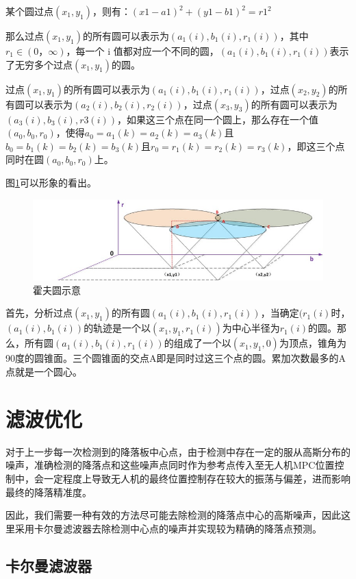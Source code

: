 某个圆过点$(x_{1}, y_{1})$，则有：$(x1-a1)^2 + (y1-b1)^2 = r1^2$

那么过点$(x_{1}, y_{1})$的所有圆可以表示为$(a_{1}(i), b_{1}(i), r_{1}(i))$，其中$r_{1} \in (0，\infty)$，每⼀个 i 值都对应⼀个不同的圆，$(a_{1}(i), b_{1}(i), r_{1}(i))$表示了无穷多个过点$(x_{1}, y_{1})$的圆。

过点$(x_{1}, y_{1})$的所有圆可以表示为$(a_{1}(i), b_{1}(i),r_{1}(i))$，过点$(x_{2}, y_{2})$的所有圆可以表示为$(a_{2}(i),b_{2}(i),r_{2}(i))$，过点$(x_{3}, y_{3})$的所有圆可以表示为$(a_{3}(i),b_{3}(i),r3(i))$，如果这三个点在同一个圆上，那么存在一个值$(a_{0},b_{0},r_{0})$，使得$a_{0} = a_{1}(k) = a_{2}(k) = a_{3}(k)$且$b_{0} = b_{1}(k) = b_{2}(k) = b_{3}(k)$且$r_{0} = r_{1}(k) = r_{2}(k) = r_{3}(k)$，即这三个点同时在圆$(a_{0}, b_{0}, r_{0})$上。

图\ref{Fig:img2}可以形象的看出。

\begin{figure}[ht]
  \centering
  \includegraphics[width=0.8\linewidth]{./Figure/Hough_Circle.png}
  \caption{霍夫圆示意}\label{Fig:img2}
\end{figure}

⾸先，分析过点$(x_{1}, y_{1})$的所有圆$(a_{1}(i), b_{1}(i),r_{1}(i))$，当确定$(r_{1}(i)$时，$(a_{1}(i), b_{1}(i))$的轨迹是⼀个以$(x_{1}, y_{1}, r_{1}(i))$为中心半径为$r_{1}(i)$的圆。那么，所有圆$(a_{1}(i), b_{1}(i),r_{1}(i))$的组成了一个以$(x_{1}, y_{1}, 0)$为顶点，锥角为90度的圆锥面。三个圆锥面的交点A即是同时过这三个点的圆。累加次数最多的A点就是一个圆⼼。

\section{滤波优化}

对于上一步每一次检测到的降落板中心点，由于检测中存在一定的服从高斯分布的噪声，准确检测的降落点和这些噪声点同时作为参考点传入至无人机MPC位置控制中，会一定程度上导致无人机的最终位置控制存在较大的振荡与偏差，进而影响最终的降落精准度。

因此，我们需要一种有效的方法尽可能去除检测的降落点中心的高斯噪声，因此这里采用卡尔曼滤波器去除检测中心点的噪声并实现较为精确的降落点预测。

\subsection{卡尔曼滤波器}

